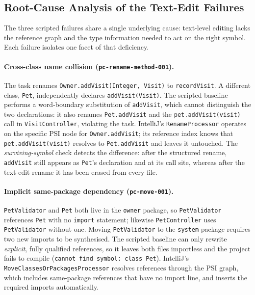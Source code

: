 \subsection{Root-Cause Analysis of the Text-Edit Failures}
\label{sec:eval-rootcause}
The three scripted failures share a single underlying cause: text-level editing
lacks the reference graph and the type information needed to act on the right
symbol. Each failure isolates one facet of that deficiency.

\paragraph{Cross-class name collision (\texttt{pc-rename-method-001}).}
The task renames \texttt{Owner.addVisit(Integer, Visit)} to \texttt{recordVisit}.
A different class, \texttt{Pet}, independently declares \texttt{addVisit(Visit)}.
The scripted baseline performs a word-boundary substitution of \texttt{addVisit},
which cannot distinguish the two declarations: it also renames \texttt{Pet.addVisit}
and the \texttt{pet.addVisit(visit)} call in \texttt{VisitController}, violating
the task. IntelliJ's \texttt{RenameProcessor} operates on the specific PSI node
for \texttt{Owner.addVisit}; its reference index knows that
\texttt{pet.addVisit(visit)} resolves to \texttt{Pet.addVisit} and leaves it
untouched. The \emph{surviving-symbol} check detects the difference: after the
structured rename, \texttt{addVisit} still appears as \texttt{Pet}'s declaration
and at its call site, whereas after the text-edit rename it has been erased from
every file.

\paragraph{Implicit same-package dependency (\texttt{pc-move-001}).}
\texttt{PetValidator} and \texttt{Pet} both live in the \texttt{owner} package, so
\texttt{PetValidator} references \texttt{Pet} with no \texttt{import} statement;
likewise \texttt{PetController} uses \texttt{PetValidator} without one. Moving
\texttt{PetValidator} to the \texttt{system} package requires two new imports to be
synthesised. The scripted baseline can only rewrite \emph{explicit}, fully
qualified references, so it leaves both files importless and the project fails to
compile (\texttt{cannot find symbol: class Pet}). IntelliJ's
\texttt{MoveClassesOrPackagesProcessor} resolves references through the PSI graph,
which includes same-package references that have no import line, and inserts the
required imports automatically.

